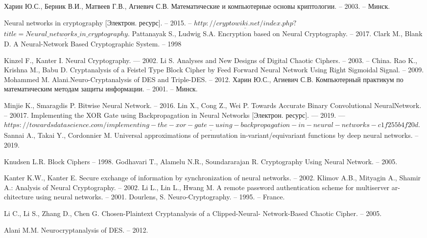 \begin{thebibliography}{3}
	 Харин Ю.С., Берник В.И., Матвеев Г.В., Агиевич С.В. Математические и компьютерные основы криптологии. -- 2003. -- Минск.
	
	 Neural networks in cryptography [Электрон. ресурс]. -- 2015. -- 
	$\underline{http://cryptowiki.net/index.php?}$\\
	$\underline{title=Neural\_networks\_in\_cryptography}$.
	 Pattanayak S., Ludwig S.A. Encryption based on Neural Cryptography. -- 2017.
	Clark M., Blank D. A Neural-Network Based Cryptographic System. -- 1998
	
	 Kinzel F., Kanter I. Neural Cryptography. — 2002.
	 Li S. Analyses and New Designs of Digital Chaotic Ciphers. -- 2003. -- China.
		 Rao K., Krishna M., Babu D. Cryptanalysis of a Feistel Type Block Cipher by Feed
	Forward Neural Network Using Right Sigmoidal Signal. -- 2009.
	 Mohammed M. Alani.Neuro-Cryptanalysis of DES and Triple-DES. -- 2012.
	 Харин Ю.С., Агиевич С.В. Компьютерный практикум по математическим методам защиты информации. -- 2001. -- Минск.
	
	 Minjie K., Smaragdis P. Bitwise Neural Network. -- 2016.
	 Lin X., Cong Z., Wei P. Towards Accurate Binary Convolutional NeuralNetwork. -- 20017.
	 Implementing the XOR Gate using Backpropagation in Neural Networks [Электрон. ресурс]. — 2019. — $\underline{https://towardsdatascience.com/implementing-the-xor-gate-using-backpropagation-in-neural-networks-c1f255b4f20d}$.
	 Sannai A., Takai Y., Cordonnier M. Universal approximations of permutation in-variant/equivariant functions by deep neural networks. -- 2019.
	
	
	 Knudsen L.R. Block Ciphers -- 1998.
 Godhavari T., Alamelu N.R., Soundararajan R. Cryptography Using Neural Network. -- 2005.

	 Kanter K.W., Kanter E. Secure exchange of information by synchronization of neural
	networks. -- 2002.
	 Klimov A.B., Mityagin A., Shamir A.: Analysis of Neural Cryptography. -- 2002.
	 Li L., Lin L., Hwang M. A remote password authentication scheme for multiserver ar-
	chitecture using neural networks. -- 2001.
	 Dourlens, S. Neuro-Cryptography. -- 1995. -- France.

	 Li C., Li S., Zhang D., Chen G. Chosen-Plaintext Cryptanalysis of a Clipped-Neural-
	Network-Based Chaotic Cipher. -- 2005.

	 Alani M.M. Neurocryptanalysis of DES. -- 2012.
    
\end{thebibliography}

